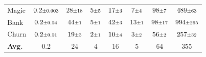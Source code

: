 \begin{table}[htbp]
\begin{tabular}{lccccccc}
Magic & $0.2 \text{\scriptsize$\pm$0.003}$ & $28 \text{\scriptsize$\pm$18}$ & $5 \text{\scriptsize$\pm$5}$ & $17 \text{\scriptsize$\pm$3}$ & $7 \text{\scriptsize$\pm$4}$ & $98 \text{\scriptsize$\pm$7}$ & $489 \text{\scriptsize$\pm$63}$ \\
Bank & $0.2 \text{\scriptsize$\pm$0.04}$ & $44 \text{\scriptsize$\pm$1}$ & $5 \text{\scriptsize$\pm$1}$ & $42 \text{\scriptsize$\pm$3}$ & $13 \text{\scriptsize$\pm$1}$ & $98 \text{\scriptsize$\pm$17}$ & $994 \text{\scriptsize$\pm$265}$ \\
Churn & $0.2 \text{\scriptsize$\pm$0.01}$ & $19 \text{\scriptsize$\pm$3}$ & $2 \text{\scriptsize$\pm$1}$ & $10 \text{\scriptsize$\pm$4}$ & $3 \text{\scriptsize$\pm$2}$ & $56 \text{\scriptsize$\pm$2}$ & $257 \text{\scriptsize$\pm$32}$ \\
\midrule
\textbf{Avg.} & 0.2 & 24 & 4 & 16 & 5 & 64 & 355 \\
\bottomrule
\end{tabular}
\end{table}

